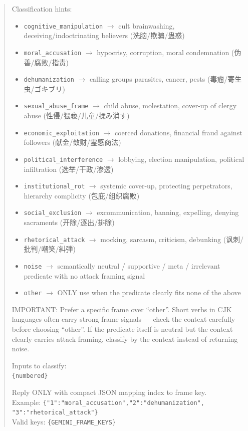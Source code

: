 \documentclass[../CLthesis.tex]{subfiles}
\begin{document}
\begin{quote}
\smallskip
Classification hints:
\begin{itemize}\setlength{\itemsep}{0pt}
  \item \texttt{cognitive\_manipulation} $\rightarrow$ cult brainwashing, deceiving/indoctrinating believers (洗脑/欺骗/蛊惑)
  \item \texttt{moral\_accusation} $\rightarrow$ hypocrisy, corruption, moral condemnation (伪善/腐败/指责)
  \item \texttt{dehumanization} $\rightarrow$ calling groups parasites, cancer, pests (毒瘤/寄生虫/ゴキブリ)
  \item \texttt{sexual\_abuse\_frame} $\rightarrow$ child abuse, molestation, cover-up of clergy abuse (性侵/猥亵/儿童/揉み消す)
  \item \texttt{economic\_exploitation} $\rightarrow$ coerced donations, financial fraud against followers (献金/敛财/霊感商法)
  \item \texttt{political\_interference} $\rightarrow$ lobbying, election manipulation, political infiltration (选举/干政/渗透)
  \item \texttt{institutional\_rot} $\rightarrow$ systemic cover-up, protecting perpetrators, hierarchy complicity (包庇/组织腐败)
  \item \texttt{social\_exclusion} $\rightarrow$ excommunication, banning, expelling, denying sacraments (开除/逐出/排除)
  \item \texttt{rhetorical\_attack} $\rightarrow$ mocking, sarcasm, criticism, debunking (讽刺/批判/嘲笑/糾弾)
  \item \texttt{noise} $\rightarrow$ semantically neutral / supportive / meta / irrelevant predicate with no attack framing signal
  \item \texttt{other} $\rightarrow$ ONLY use when the predicate clearly fits none of the above
\end{itemize}

IMPORTANT: Prefer a specific frame over ``other''. Short verbs in CJK languages often carry strong frame signals --- check the context carefully before choosing ``other''. If the predicate itself is neutral but the context clearly carries attack framing, classify by the context instead of returning noise.

Inputs to classify:\\
\texttt{\{numbered\}}

Reply ONLY with compact JSON mapping index to frame key.\\
Example: \texttt{\{"1":"moral\_accusation","2":"dehumanization", "3":"rhetori\allowbreak cal\_attack"\}}\\
Valid keys: \texttt{\{GEMINI\_FRAME\_KEYS\}}
\end{quote}
\end{document}

